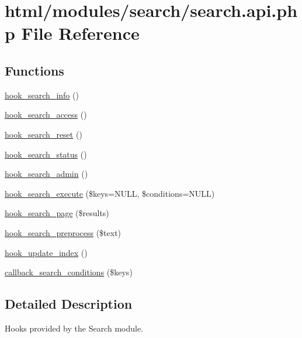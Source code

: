\hypertarget{search_8api_8php}{
\section{html/modules/search/search.api.php File Reference}
\label{search_8api_8php}
}
\subsection*{Functions}
\begin{DoxyCompactItemize}
\item 
\hyperlink{group__search_ga37b761616f2cad4796891008f2b374f3}{hook\_\-search\_\-info} ()
\item 
\hyperlink{group__search_gac49e6fd7370e65efeaf484ec992de1f0}{hook\_\-search\_\-access} ()
\item 
\hyperlink{group__search_gaefc7ab0e4a53a2752371dcccaec41deb}{hook\_\-search\_\-reset} ()
\item 
\hyperlink{group__search_gafb7f508058afed4fe670974b82b072f2}{hook\_\-search\_\-status} ()
\item 
\hyperlink{group__search_gae7c7a4e3d4ee63b5aab3742b0e12624e}{hook\_\-search\_\-admin} ()
\item 
\hyperlink{group__search_ga00be3e4a3b64ad73f8ad1304a450cee5}{hook\_\-search\_\-execute} (\$keys=NULL, \$conditions=NULL)
\item 
\hyperlink{group__hooks_ga422b9506b3dfd8ed5aa8bfaea98844b9}{hook\_\-search\_\-page} (\$results)
\item 
\hyperlink{group__search_ga3c935c295da9103bc7184f6ec869c533}{hook\_\-search\_\-preprocess} (\$text)
\item 
\hyperlink{group__search_ga23d6f6642bd53c4f033f10e9c1b12d43}{hook\_\-update\_\-index} ()
\item 
\hyperlink{group__search_gab59b17cb3637c3acccf3c73cd5c1195d}{callback\_\-search\_\-conditions} (\$keys)
\end{DoxyCompactItemize}


\subsection{Detailed Description}
Hooks provided by the Search module. 